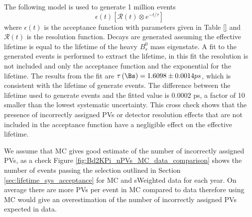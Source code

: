 {%

The following model is used to generate 1 million events
\begin{equation}
\epsilon (t) [\mathcal{R}(t) \otimes e^{-t/\tau}]
\end{equation}
where $\epsilon (t)$ is the acceptance function with parameters given in Table \ref{} and $\mathcal{R}(t)$ is the resolution function. Decays are generated assuming the \bsmumu effective lifetime is equal to the lifetime of the heavy $B^{0}_{s}$ mass eigenstate. A fit to the generated events is performed to extract the lifetime, in this fit the resolution is not included and only the acceptance function and the exponential for the lifetime. The results from the fit are $\tau\left(\Bs\right) = 1.6098\pm 0.0014 \ps$, which is consistent with the lifetime of generate events. The difference between the lifetime used to generate events and the fitted value is 0.0002 ps, a factor of 10 smaller than the lowest systematic uncertainty. This cross check shows that the presence of incorrectly assigned PVs or detector resolution effects that are not included in the acceptance function have a negligible effect on the \bsmumu effective lifetime.


 We assume that MC gives good estimate of the number of incorrectly assigned PVs, as a check Figure \ref{fig:Bd2KPi_nPVs_MC_data_comparison} shows the number of \bdkpi events passing the selection outlined in Section \ref{sec:lifetime_sys_acceptance} for MC and sWeighted data for each year. On average there are more PVs per event in MC compared to data therefore using MC would give an overestimation of the number of incorrectly assigned PVs expected in data. 

}
